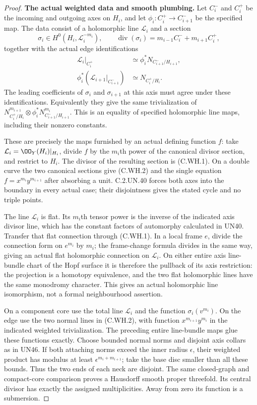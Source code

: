 \begin{proof}
\par\medskip\noindent\textbf{The actual weighted data and smooth plumbing.}
Let $C_i^-$ and $C_i^+$ be the incoming and
outgoing axes on $H_i$, and let
$\phi_i:C_i^+\to C_{i+1}^-$ be the specified map.
The data consist of a holomorphic line
$\mathcal L_i$ and a section
\[
 \sigma_i\in H^0(H_i,\mathcal L_i^{-m_i}),
 \qquad
 \operatorname{div}(\sigma_i)=
       m_{i-1}C_i^-+m_{i+1}C_i^+,
\tag{C.WH.1}
\]
together with the actual edge identifications
\[
 \begin{aligned}
 \mathcal L_i|_{C_i^+}
   &\simeq \phi_i^*N_{C_{i+1}^-/H_{i+1}},\\
 \phi_i^*(\mathcal L_{i+1}|_{C_{i+1}^-})
   &\simeq N_{C_i^+/H_i}.
 \end{aligned}
\tag{C.WH.2}
\]
The leading coefficients of $\sigma_i$ and
$\sigma_{i+1}$ at this axis must agree under
these identifications. Equivalently they
give the same trivialization of
$N_{C_i^+/H_i}^{m_{i+1}}\otimes
 \phi_i^*N_{C_{i+1}^-/H_{i+1}}^{m_i}$.
This is an equality of specified holomorphic
line maps, including their nonzero constants.

These are precisely the maps furnished by
an actual defining function $f$:
take $\mathcal L_i=\OO_Y(H_i)|_{H_i}$,
divide $f$ by the $m_i$th power of the
canonical divisor section, and restrict
to $H_i$. The divisor of the resulting
section is (C.WH.1). On a double curve
the two canonical sections give (C.WH.2)
and the single equation $f=x^{m_i}y^{m_{i+1}}$
after absorbing a unit. C.2.UN.40 forces
both axes into the boundary in every
actual case; their disjointness gives
the stated cycle and no triple points.

The line $\mathcal L_i$ is flat. Its
$m_i$th tensor power is the inverse of
the indicated axis divisor line, which
has the constant factors of automorphy
calculated in UN40. Transfer that flat
connection through (C.WH.1). In a local
frame $e$, divide the connection form
on $e^{m_i}$ by $m_i$; the frame-change
formula divides in the same way, giving
an actual flat holomorphic connection
on $\mathcal L_i$.
On either entire axis line-bundle chart
of the Hopf surface it is therefore the
pullback of its axis restriction:
the projection is a homotopy equivalence,
and the two flat holomorphic lines have
the same monodromy character. This gives
an actual holomorphic line isomorphism,
not a formal neighbourhood assertion.

On a component core use the total line
$\mathcal L_i$ and the function
$\sigma_i(v^{m_i})$. On the edge use the
two normal lines in (C.WH.2), with function
$x^{m_{i+1}}y^{m_i}$ in the indicated
weighted trivialization. The preceding
entire line-bundle maps glue these
functions exactly. Choose bounded normal
norms and disjoint axis collars as in
UN46. If both attaching norms exceed
the inner radius $\epsilon$, their
weighted product has modulus at least
$\epsilon^{m_i+m_{i+1}}$; take the base
disc smaller than all these bounds.
Thus the two ends of each neck are
disjoint. The same closed-graph and
compact-core comparison proves a
Hausdorff smooth proper threefold.
Its central divisor has exactly the
assigned multiplicities. Away from
zero its function is a submersion.


\end{proof}

